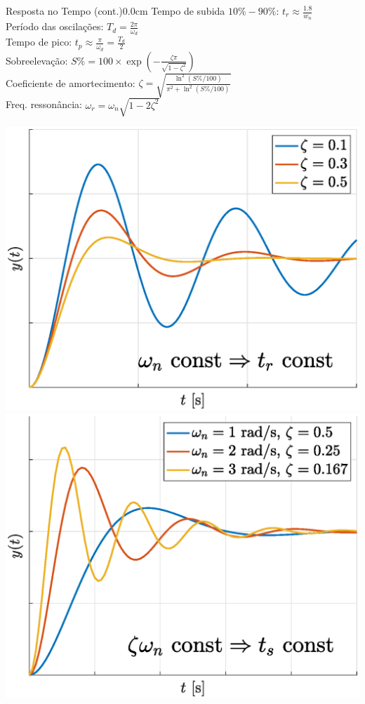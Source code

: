 \documentclass[portuguese,10pt,3col]{cheatsheet}
\begin{document}
\begin{multicols}{3}
\begin{cheatsheetbox}{Resposta no Tempo (cont.)}{0.0cm}
    Tempo de subida $10\% - 90\%$: $t_r \approx \frac{1.8}{w_n}$ \\
    Período das oscilações: $T_d = \frac{2\pi}{\omega_d}$ \\
    Tempo de pico: $t_p \approx \frac{\pi}{\omega_d} = \frac{T_d}{2}$ \\
    Sobreelevação: $S\% = 100 \times \exp\left(-\frac{\zeta \pi}{\sqrt{1 - \zeta^2}}\right)$ \\
    Coeficiente de amortecimento: $\zeta = \sqrt{\frac{\ln^2(S\%/100)}{\pi^2 + \ln^2(S\%/100)}}$ \\
    Freq. ressonância: $\omega_r = \omega_n \sqrt{1 - 2\zeta^2}$
    
    \hspace{-1.0 cm}
    
    \begin{minipage}{.16\textwidth}
        \centering
        \scalebox{0.5}{}
        \scalebox{0.5}{}
    \end{minipage}%
    \begin{minipage}{.35\textwidth}
        \centering
        \includegraphics[scale = 0.15]{figs/fig4.eps}
        \includegraphics[scale = 0.15]{figs/fig5.eps}

\end{minipage}
\end{cheatsheetbox}
\end{multicols}
\end{document}
